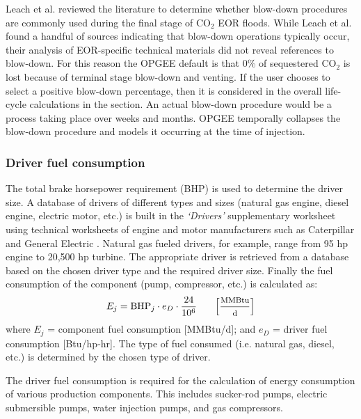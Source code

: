\documentclass[11pt]{report}
\newcommand{\marg}[1]{{\footnotesize\textit{\textcolor{stanford}{'#1'}}}}
\newcommand{\marginnote}[1]{\marginpar{\marg{#1}}}
\newcommand{\sheet}[1]{\textit{`{#1}'}}
\begin{document}
{Leach et al. \cite{leach2011co} reviewed the literature to determine whether blow-down procedures are commonly used during the final stage of CO$_2$ EOR floods. While Leach et al. \cite{leach2011co} found a handful of sources indicating that blow-down operations typically occur, their analysis of EOR-specific technical materials did not reveal references to blow-down. For this reason the OPGEE default \marginnote{Production \& Extraction 1.2.9.3} is that 0\% of sequestered CO$_2$ is lost because of terminal stage blow-down and venting. If the user chooses to select a positive blow-down percentage, then it is considered in the overall life-cycle calculations in the  section. An actual blow-down procedure would be a process taking place over weeks and months. OPGEE temporally collapses the blow-down procedure and models it occurring at the time of injection.  


\subsubsection{Driver fuel consumption} \label{sec:prod_drivers}

The total brake horsepower requirement (BHP) is used to determine the driver size. A database of drivers of different types and sizes (natural gas engine, diesel engine, electric motor, etc.) is built in the \sheet{Drivers} supplementary worksheet using technical worksheets of engine and motor manufacturers such as Caterpillar and General Electric \cite{Caterpillar2012, GE2011}. Natural gas fueled drivers, for example, range from 95 hp engine to 20,500 hp turbine. The appropriate driver is retrieved from a database based on the chosen driver type and the required driver size. Finally the fuel consumption of the component (pump, compressor, etc.) is calculated as: \marginnote{Production \& Extraction 3.1} 
\begin{equation} \label{eq:component_fuel_consumption}
E_{j} = \text{BHP}_{j} \cdot e_{D} \cdot \frac{24}{10^6} \begin{footnotesize} \quad\quad\left[\frac{\text{MMBtu}}{\text{d}}\right] \end{footnotesize}
\end{equation}
where $E_{j}$ = component fuel consumption [MMBtu/d]; and $e_{D}$ = driver fuel consumption [Btu/hp-hr]. The type of fuel consumed (i.e. natural gas, diesel, etc.) is determined by the chosen type of driver.

The driver fuel consumption is required for the calculation of energy consumption of various production components. This includes sucker-rod pumps, electric submersible pumps, water injection pumps, and gas compressors. 

}
\end{document}
